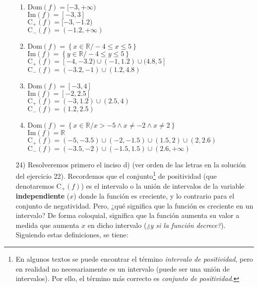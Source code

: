\documentclass[12pt]{article}
\begin{document}
\begin{enumerate}
\begin{enumerate}
    \item 
    $\text{Dom}(f) = [-3,+\infty)$\\
    $\text{Im}(f) = [-3,3]$\\
	$\text{C}_{+}(f) = [-3,-1.2)$\\
	$\text{C}_{-}(f) = (-1.2,+\infty)$

    \item
    $\text{Dom}(f) = \left\{x \in \mathbb{R} / -4 \leq x \leq 5\right\}$\\
    $\text{Im}(f) = \left\{y \in \mathbb{R} / -4 \leq y \leq 5\right\}$\\
    $\text{C}_{+}(f) = [-4,-3.2) \cup (-1,1.2) \cup (4.8,5]$\\
    $\text{C}_{-}(f) = (-3.2,-1) \cup (1.2,4.8)$
    
    \item 
	$\text{Dom}(f) = [-3,4]$\\
	$\text{Im}(f) = [-2,2.5]$\\
	$\text{C}_{+}(f) = (-3,1.2) \cup (2.5,4)$\\
	$\text{C}_{-}(f) = (1.2,2.5)$
	
	\item
	$\text{Dom}(f) = \left\{x \in \mathbb{R} / x > -5 \land x \neq -2 \land x \neq 2\right\}$\\
	$\text{Im}(f) = \mathbb{R}$\\
	$\text{C}_{+}(f) = (-5,-3.5) \cup (-2,-1.5) \cup (1.5,2) \cup (2,2.6)$\\
	$\text{C}_{-}(f) = (-3.5,-2) \cup (-1.5,1.5) \cup (2.6,+\infty)$
\end{enumerate}

\item[24)] Resolveremos primero el inciso d) (ver orden de las letras en la solución del ejercicio 22). Recordemos que el conjunto\footnote{En algunos textos se puede encontrar el término \textit{intervalo de positividad}, pero en realidad no necesariamente es un intervalo (puede ser una unión de intervalos). Por ello, el término más correcto es \textit{conjunto de positividad}.} de positividad (que denotaremos $\text{C}_{+}(f)$) es el intervalo o la unión de intervalos de la variable \textbf{independiente} ($x$) donde la función es creciente, y lo contrario para el conjunto de negatividad. Pero, ¿qué significa que la función es creciente en un intervalo? De forma coloquial, significa que la función aumenta su valor a medida que aumenta $x$ en dicho intervalo (\textit{¿y si la función decrece?}). Siguiendo estas definiciones, se tiene:
 

\end{enumerate}
\end{document}
